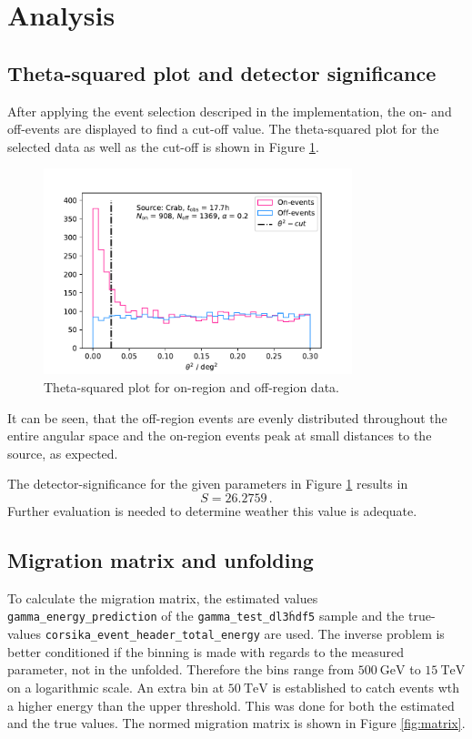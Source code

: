 \section{Analysis}
\label{sec:auswertung}

\subsection{Theta-squared plot and detector significance}
After applying the event selection descriped in the implementation, the on- and off-events are
displayed to find a cut-off value.
The theta-squared plot for the selected data as well as the cut-off is shown in Figure \ref{fig:onoff}.

\begin{figure}[H]
  \centering
  \includegraphics[width=0.8\textwidth]{plots/On_Off.pdf}
  \caption{Theta-squared plot for on-region and off-region data.}
  \label{fig:onoff}
\end{figure}

It can be seen, that the off-region events are evenly distributed throughout the entire angular space and the on-region events peak at small distances to the source, as expected.

The detector-significance for the given parameters in Figure \ref{fig:onoff} results in
\begin{equation}
  S = 26.2759\,.
\end{equation}
Further evaluation is needed to determine weather this value is adequate.

\subsection{Migration matrix and unfolding}
To calculate the migration matrix, the estimated values \texttt{gamma\_energy\_prediction} of the \texttt{gamma\_test\_dl3\.hdf5}
sample and the true-values \texttt{corsika\_event\_header\_total\_energy} are used.
The inverse problem is better conditioned if the binning is made with regards to the measured parameter, not in the unfolded.
Therefore the bins range from $\SI{500}{\giga\electronvolt}$ to $\SI{15}{\tera\electronvolt}$ on a logarithmic scale.
An extra bin at $\SI{50}{\tera\electronvolt}$ is established to catch events wth a higher energy than the upper threshold.
This was done for both the estimated and the true values. The normed migration matrix is shown in Figure \ref{fig:matrix}.

